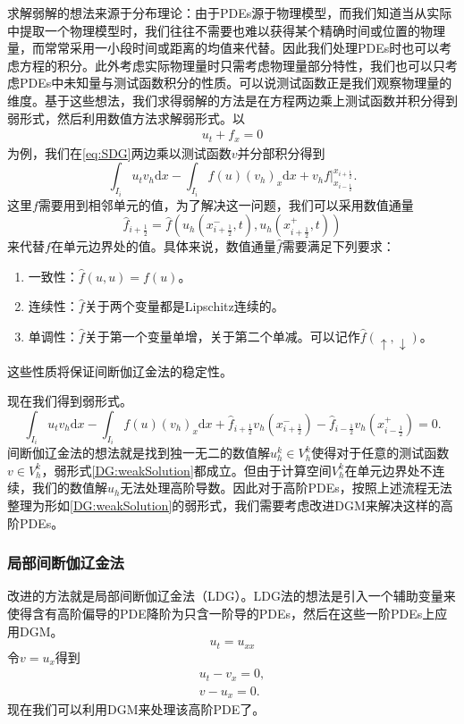 求解弱解的想法来源于分布理论：由于PDEs源于物理模型，而我们知道当从实际中提取一个物理模型时，我们往往不需要也难以获得某个精确时间或位置的物理量，而常常采用一小段时间或距离的均值来代替。因此我们处理PDEs时也可以考虑方程的积分。此外考虑实际物理量时只需考虑物理量部分特性，我们也可以只考虑PDEs中未知量与测试函数积分的性质。可以说测试函数正是我们观察物理量的维度。基于这些想法，我们求得弱解的方法是在方程两边乘上测试函数并积分得到弱形式，然后利用数值方法求解弱形式。以
\begin{align}
    u_t + f_x = 0\label{eq:SDG}
\end{align}
为例，我们在\eqref{eq:SDG}两边乘以测试函数$v$并分部积分得到
\begin{equation}
    \int_{I_i}u_t v_h\mathrm{d}x - \int_{I_i}f(u)(v_h)_x\mathrm{d}x+v_hf\bigg|^{x_{i+\frac{1}{2}}}_{x_{i-\frac{1}{2}}}.
\end{equation}
这里$f$需要用到相邻单元的值，为了解决这一问题，我们可以采用数值通量
\begin{equation*}
    \hat{f}_{i+\frac{1}{2}}=\hat{f}(u_h(x^-_{i+\frac{1}{2}},t),u_h(x^+_{i+\frac{1}{2}},t))
\end{equation*}
来代替$f$在单元边界处的值。具体来说，数值通量$\hat{f}$需要满足下列要求：
\begin{enumerate}
    \item 一致性：$\hat{f}(u,u)=f(u)$。
    \item 连续性：$\hat{f}$关于两个变量都是Lipschitz连续的。
    \item 单调性：$\hat{f}$关于第一个变量单增，关于第二个单减。可以记作$\hat{f}(\uparrow,\downarrow)$。
\end{enumerate}
这些性质将保证间断伽辽金法的稳定性。

现在我们得到弱形式。
\begin{equation}
    \int_{I_i}u_t v_h\mathrm{d}x - \int_{I_i}f(u)(v_h)_x\mathrm{d}x+\hat{f}_{i+\frac{1}{2}}v_h(x^-_{i+\frac{1}{2}})-\hat{f}_{i-\frac{1}{2}}v_h(x^+_{i-\frac{1}{2}}) = 0. \label{DG:weakSolution}
\end{equation}
间断伽辽金法的想法就是找到独一无二的数值解$u_h^k\in V_h^k$使得对于任意的测试函数$v \in V_h^k$，弱形式\eqref{DG:weakSolution}都成立。但由于计算空间$V_h^k$在单元边界处不连续，我们的数值解$u_h$无法处理高阶导数。因此对于高阶PDEs，按照上述流程无法整理为形如\eqref{DG:weakSolution}的弱形式，我们需要考虑改进DGM来解决这样的高阶PDEs。
\subsubsection{局部间断伽辽金法}
改进的方法就是局部间断伽辽金法（LDG）。LDG法的想法是引入一个辅助变量来使得含有高阶偏导的PDE降阶为只含一阶导的PDEs，然后在这些一阶PDEs上应用DGM。
\begin{equation}
    u_t = u_{xx}
\end{equation}
令$v = u_x$得到
\begin{align}
    u_t - v_x = 0, \\
    v - u_x = 0.
\end{align}
现在我们可以利用DGM来处理该高阶PDE了。
